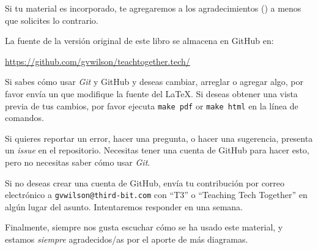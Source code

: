 Si tu material es incorporado,
te agregaremos a los agradecimientos () a menos que solicites lo contrario.

La fuente de la versión original de este libro se almacena en GitHub en:

\begin{center}
  \url{https://github.com/gvwilson/teachtogether.tech/}
\end{center}

\noindent
Si sabes cómo usar \emph{Git} y GitHub y deseas cambiar, arreglar o agregar algo,
por favor envía un  que modifique la fuente del LaTeX.
Si deseas obtener una vista previa de tus cambios,
por favor ejecuta \texttt{make~pdf} or \texttt{make~html} en la línea de comandos.

Si quieres reportar un error,
hacer una pregunta,
o hacer una sugerencia,
presenta un \emph{issue} en el repositorio.
Necesitas tener una cuenta de GitHub para hacer esto,
pero no necesitas saber cómo usar \emph{Git}.

Si no deseas crear una cuenta de GitHub,
envía tu contribución por correo electrónico a \texttt{gvwilson@third-bit.com}
con ``T3'' o ``Teaching Tech Together'' en algún lugar del asunto.
Intentaremos responder en una semana.

Finalmente,
siempre nos gusta escuchar cómo se ha usado este material,
y estamos \emph{siempre} agradecidos/as por el aporte de más diagramas.
